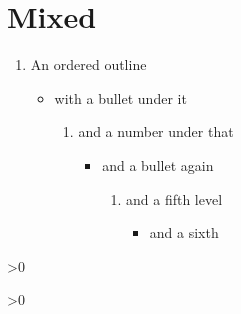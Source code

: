 \documentclass[twoside]{memoir}
\begin{document}
\section{Mixed}
\begin{enumerate}
\item An ordered outline
\begin{itemize}
\item with a bullet under it
\begin{enumerate}
\item and a number under that
\begin{itemize}
\item and a bullet again
\begin{enumerate}
\item and a fifth level
\begin{itemize}
\item and a sixth
\end{itemize}
\end{enumerate}
\end{itemize}
\end{enumerate}
\end{itemize}
\end{enumerate}
\backmatter

\ifnum\value{figure}>0
\clearpage
\listoffigures
\fi
\ifnum\value{table}>0
\clearpage
\listoftables
\fi
\end{document}
